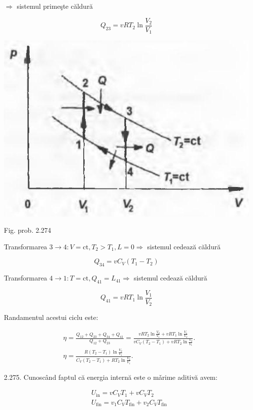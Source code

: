 \documentclass[10pt]{article}
\begin{document}
$\Rightarrow$ sistemul primeşte căldură

$$
Q_{23}=v R T_{2} \ln \frac{V_{2}}{V_{1}}
$$

\begin{center}
\includegraphics[max width=\textwidth]{2025_07_01_5b3ff9fa0d508c8e9f17g-330}
\end{center}

Fig. prob. 2.274

Transformarea $3 \rightarrow 4: V=\mathrm{ct}, T_{2}>T_{1}, L=0 \Rightarrow$ sistemul cedează căldură

$$
Q_{34}=v C_{V}\left(T_{1}-T_{2}\right)
$$

Transformarea $4 \rightarrow 1: T=\mathrm{ct}, Q_{41}=L_{41} \Rightarrow$ sistemul cedează căldură

$$
Q_{41}=v R T_{1} \ln \frac{V_{1}}{V_{2}}
$$

Randamentul acestui ciclu este:

$$
\begin{aligned}
& \eta=\frac{Q_{12}+Q_{23}+Q_{34}+Q_{41}}{Q_{12}+Q_{23}}=\frac{v R T_{2} \ln \frac{V_{2}}{V_{1}}+v R T_{1} \ln \frac{V_{1}}{V_{2}}}{v C_{V}\left(T_{2}-T_{1}\right)+v R T_{2} \ln \frac{V_{2}}{V_{1}}} . \\
& \eta=\frac{R\left(T_{2}-T_{1}\right) \ln \frac{V_{2}}{V_{1}}}{C_{V}\left(T_{2}-T_{1}\right)+R T_{2} \ln \frac{V_{2}}{V_{1}}} .
\end{aligned}
$$

2.275. Cunoscând faptul că energia internă este o mǎrime aditivă avem:


\begin{align*}
& U_{\mathrm{in}}=v C_{V} T_{1}+v C_{V} T_{2}  \tag{1}\\
& U_{\mathrm{fin}}=v_{1} C_{V} T_{\mathrm{fin}}+v_{2} C_{V} T_{\mathrm{fin}} \tag{2}
\end{align*}
\end{document}
